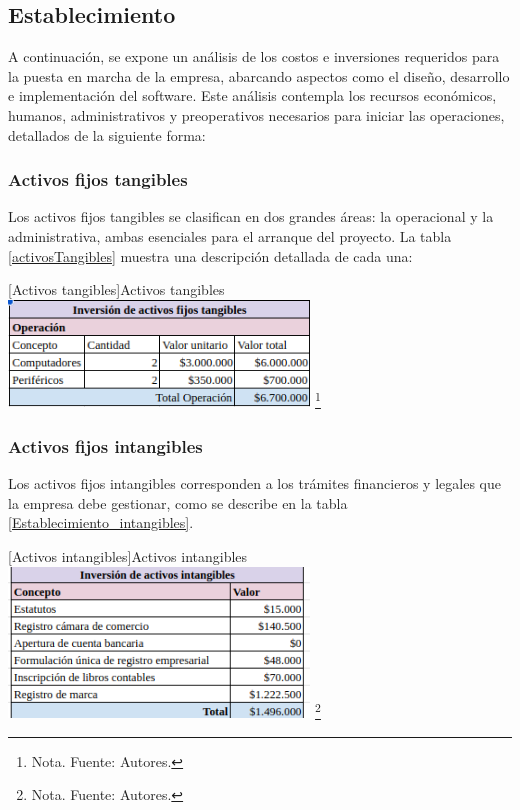 \subsection{Establecimiento}

A continuación, se expone un análisis de los costos e inversiones requeridos para la puesta en marcha de la empresa, abarcando aspectos como el diseño, desarrollo e implementación del software. Este análisis contempla los recursos económicos, humanos, administrativos y preoperativos necesarios para iniciar las operaciones, detallados de la siguiente forma:

\subsubsection{Activos fijos tangibles}

Los activos fijos tangibles se clasifican en dos grandes áreas: la operacional y la administrativa, ambas esenciales para el arranque del proyecto. La tabla \ref{activosTangibles} muestra una descripción detallada de cada una:

\vspace{2mm}
\begin{minipage}{0.9\textwidth}
\centering
{}[Activos tangibles]{Activos tangibles}
\label{activosTangibles}
\includegraphics[width=0.6\textwidth]{Content/Images/AF/Establecimiento_tangibles.png}
\footnote{Nota. \textup{Fuente: Autores.}}
\end{minipage}

\subsubsection{Activos fijos intangibles}

Los activos fijos intangibles corresponden a los trámites financieros y legales que la empresa debe gestionar, como se describe en la tabla \ref{Establecimiento_intangibles}.

\vspace{2mm}
\begin{minipage}{0.9\textwidth}
\centering
{}[Activos intangibles]{Activos intangibles}
\label{Establecimiento_intangibles}
\includegraphics[width=0.6\textwidth]{Content/Images/AF/Establecimiento_intangibles.png}
\footnote{Nota. \textup{Fuente: Autores.}}
\end{minipage}

